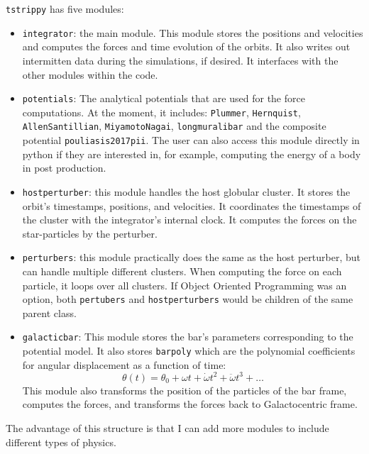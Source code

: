 \documentclass{article}
\begin{document}
    \texttt{tstrippy} has five modules:
    \begin{itemize}
        \item \texttt{integrator}: the main module. This module stores the positions and velocities and computes the forces and time evolution of the orbits. It also writes out intermitten data during the simulations, if desired. It interfaces with the other modules within the code. 
        \item \texttt{potentials}: The analytical potentials that are used for the force computations. At the moment, it includes: \texttt{Plummer}, \texttt{Hernquist}, \texttt{AllenSantillian}, \texttt{MiyamotoNagai}, \texttt{longmuralibar} \citep{1992ApJ...397...44L} and the composite potential \texttt{pouliasis2017pii}. The user can also access this module directly in python if they are interested in, for example, computing the energy of a body in post production.
        \item \texttt{hostperturber}: this module handles the host globular cluster. It stores the orbit's timestamps, positions, and velocities. It coordinates the timestamps of the cluster with the integrator's internal clock. It computes the forces on the star-particles by the perturber. 
        \item \texttt{perturbers}: this module practically does the same as the host perturber, but can handle multiple different clusters. When computing the force on each particle, it loops over all clusters. If Object Oriented Programming was an option, both \texttt{pertubers} and \texttt{hostperturbers} would be children of the same parent class.
        \item \texttt{galacticbar}: This module stores the bar's parameters corresponding to the potential model. It also stores \texttt{barpoly} which are the polynomial coefficients for angular displacement as a function of time:
        \[
        \theta(t) = \theta_0 + \omega t + \dot{\omega} t^2 + \ddot{\omega} t^3 + \dots
        \]
        This module also transforms the position of the particles of the bar frame, computes the forces, and transforms the forces back to Galactocentric frame.
    \end{itemize}
    The advantage of this structure is that I can add more modules to include different types of physics. 
\end{document}
